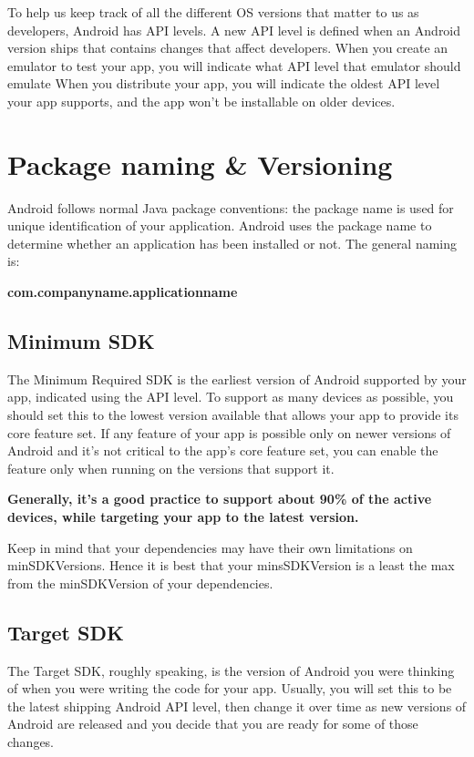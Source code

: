To help us keep track of all the different OS versions that matter to us as developers, Android has API levels.
A new API level is defined when an Android version ships that contains changes that affect developers.
When you create an emulator to test your app, you will indicate what API level that emulator should emulate
When you distribute your app, you will indicate the oldest API level your app supports, and the app won't be installable on older devices.

\section{Package naming \& Versioning}
Android follows normal Java package conventions: the package name is used for unique identification of your application.
Android uses the package name to determine whether an application has been installed or not.
The general naming is:

\begin{center}
	\textbf{com.companyname.applicationname}
\end{center}

\subsection{Minimum SDK}
The Minimum Required SDK is the earliest version of Android supported by your app, indicated using the API level.
To support as many devices as possible, you should set this to the lowest version available that allows your app to provide its core feature set.
If any feature of your app is possible only on newer versions of Android and it's not critical to the app's core feature set, you can enable the feature only when running on the versions that support it.

\textbf{Generally, it’s a good practice to support about 90\% of the active devices, while targeting your app to the latest version.}

Keep in mind that your dependencies may have their own limitations on minSDKVersions.
Hence it is best that your minsSDKVersion is a least the max from the minSDKVersion of your dependencies.

\subsection{Target SDK}
The Target SDK, roughly speaking, is the version of Android you were thinking of when you were writing the code for your app.
Usually, you will set this to be the latest shipping Android API level, then change it over time as new versions of Android are released and you decide that you are ready for some of those changes.

